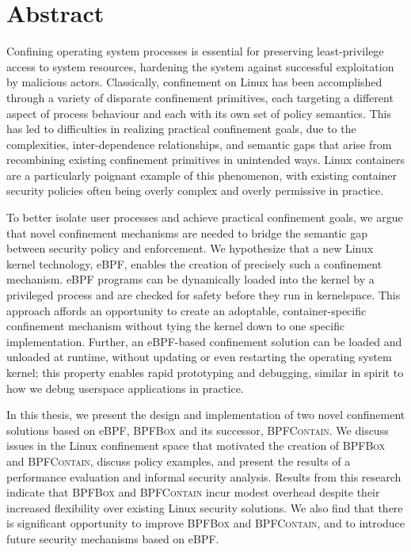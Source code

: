 \documentclass[
  fontsize=12pt,
  titlepage=firstiscover,
  paper=letter,
  oneside,
  cleardoublepage=plain,
  parskip=half-,
  DIV=10,
  parindent,
  appendixprefix,
  chapterprefix,
  listof=totoc,
]{scrbook}
\newcommand{\bpfbox}{\textsc{BPFBox}}
\newcommand{\bpfcontain}{\textsc{BPFContain}}
\begin{document}
\chapter*{Abstract}%
%
\begingroup
\small
Confining operating system processes is essential for preserving least-privilege access to
system resources, hardening the system against successful exploitation by malicious
actors. Classically, confinement on Linux has been accomplished through a variety of
disparate confinement primitives, each targeting a different aspect of process behaviour
and each with its own set of policy semantics. This has led to difficulties in realizing
practical confinement goals, due to the complexities, inter-dependence relationships, and
semantic gaps that arise from recombining existing confinement primitives in unintended
ways. Linux containers are a particularly poignant example of this phenomenon, with
existing container security policies often being overly complex and overly permissive in
practice.

To better isolate user processes and achieve practical confinement goals, we argue that
novel confinement mechanisms are needed to bridge the semantic gap between security policy
and enforcement. We hypothesize that a new Linux kernel technology, eBPF, enables the
creation of precisely such a confinement mechanism. eBPF programs can be dynamically
loaded into the kernel by a privileged process and are checked for safety before they run
in kernelspace.  This approach affords an opportunity to create an adoptable,
container-specific confinement mechanism without tying the kernel down to one specific
implementation.  Further, an eBPF-based confinement solution can be loaded and unloaded at
runtime, without updating or even restarting the operating system kernel; this property
enables rapid prototyping and debugging, similar in spirit to how we debug userspace
applications in practice.

In this thesis, we present the design and implementation of two novel confinement
solutions based on eBPF, \bpfbox{} and its successor, \bpfcontain{}. We discuss issues in
the Linux confinement space that motivated the creation of \bpfbox{} and \bpfcontain{},
discuss policy examples, and present the results of a performance evaluation and informal
security analysis. Results from this research indicate that \bpfbox{} and \bpfcontain{}
incur modest overhead despite their increased flexibility over existing Linux security
solutions.  We also find that there is significant opportunity to improve \bpfbox{} and
\bpfcontain{}, and to introduce future security mechanisms based on eBPF\@.
\end{document}
